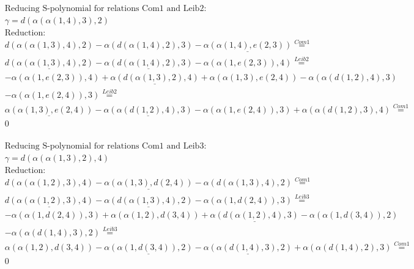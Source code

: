 \documentclass[11pt]{amsart}
\begin{document}
\begin{align*} 
& \text{Reducing S-polynomial for relations Com1 and Leib2:} \\ 
& \gamma = d(\alpha(\alpha(1,4),3),2) \\ 
& \text{Reduction}: \\&d(\alpha(\alpha(1,3),4),2) - \alpha(d(\alpha(1,4),2),3) - \underline{\alpha(\alpha(1,4),e(2,3))} \stackrel{ Com1 }{=}  \\ 
&\underline{d(\alpha(\alpha(1,3),4),2)} - \underline{\alpha(d(\alpha(1,4),2),3)} - \alpha(\alpha(1,e(2,3)),4) \stackrel{ Leib2 }{=}  \\ 
& - \alpha(\alpha(1,e(2,3)),4) + \underline{\alpha(d(\alpha(1,3),2),4)} + \alpha(\alpha(1,3),e(2,4)) - \alpha(\alpha(d(1,2),4),3)\\ 
 &  - \alpha(\alpha(1,e(2,4)),3) \stackrel{ Leib2 }{=}  \\ 
&\underline{\alpha(\alpha(1,3),e(2,4))} - \underline{\alpha(\alpha(d(1,2),4),3)} - \alpha(\alpha(1,e(2,4)),3) + \alpha(\alpha(d(1,2),3),4) \stackrel{ Com1 }{=}  \\ 
&0\\ 
\end{align*} 
 
\begin{align*} 
& \text{Reducing S-polynomial for relations Com1 and Leib3:} \\ 
& \gamma = d(\alpha(\alpha(1,3),2),4) \\ 
& \text{Reduction}: \\&d(\alpha(\alpha(1,2),3),4) - \underline{\alpha(\alpha(1,3),d(2,4))} - \alpha(d(\alpha(1,3),4),2) \stackrel{ Com1 }{=}  \\ 
&\underline{d(\alpha(\alpha(1,2),3),4)} - \underline{\alpha(d(\alpha(1,3),4),2)} - \alpha(\alpha(1,d(2,4)),3) \stackrel{ Leib3 }{=}  \\ 
& - \alpha(\alpha(1,d(2,4)),3) + \alpha(\alpha(1,2),d(3,4)) + \underline{\alpha(d(\alpha(1,2),4),3)} - \alpha(\alpha(1,d(3,4)),2)\\ 
 &  - \alpha(\alpha(d(1,4),3),2) \stackrel{ Leib3 }{=}  \\ 
&\alpha(\alpha(1,2),d(3,4)) - \underline{\alpha(\alpha(1,d(3,4)),2)} - \underline{\alpha(\alpha(d(1,4),3),2)} + \alpha(\alpha(d(1,4),2),3) \stackrel{ Com1 }{=}  \\ 
&0\\ 
\end{align*} 
 
\end{document}
